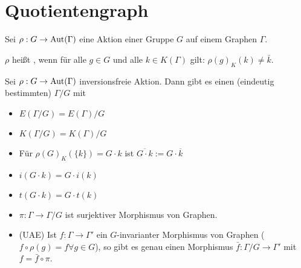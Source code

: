 \documentclass[a4paper, 10pt]{report}
\begin{document}
\section{Quotientengraph}

\begin{Def}
Sei $\rho : G \rightarrow \mbox{Aut}(\Gamma)$ eine Aktion einer Gruppe $G$ auf einem Graphen $\Gamma$.

$\rho$ hei\ss t , wenn f\"ur alle $g \in G$ und alle $k \in K(\Gamma)$ gilt: $\rho(g)_K(k) \neq \bar{k}$.
\end{Def}

\begin{DefBem}
Sei $\rho : G \rightarrow \mbox{Aut}(\Gamma)$ inversionsfreie Aktion. Dann gibt es einen (eindeutig bestimmten)  $\Gamma/G$ mit
\begin{itemize}
\item $E(\Gamma/G) = E(\Gamma)/G$

\item $K(\Gamma/G) = K(\Gamma)/G$

\item F\"ur $\rho(G)_K(\{k\}) = G \cdot k$ ist $\overline{G \cdot k} := G \cdot \overline{k}$ 

\item $i(G \cdot k) = G \cdot i(k)$

\item $t(G \cdot k) = G \cdot t(k)$

\item $\pi : \Gamma \rightarrow \Gamma/G$ ist surjektiver Morphismus von Graphen.

\item (UAE) Ist $f : \Gamma \rightarrow \Gamma'$ ein $G$-invarianter Morphismus von Graphen ($f \circ \rho(g) = f \forall g \in G$), so gibt es genau einen Morphismus $\bar{f} : \Gamma/G \rightarrow \Gamma'$ mit $f = \bar{f} \circ \pi$.

\end{itemize}
\end{DefBem}
\end{document}

